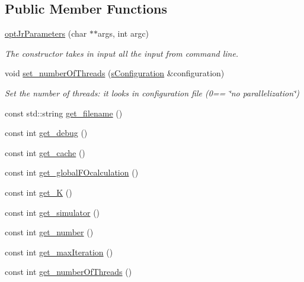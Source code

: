 \subsection*{Public Member Functions}
\begin{DoxyCompactItemize}
\item 
\hyperlink{classoptJrParameters_a76f806d48141b4b4c7a215c2645011de}{opt\-Jr\-Parameters} (char $\ast$$\ast$args, int argc)
\begin{DoxyCompactList}\small\item\em The constructor takes in input all the input from command line. \end{DoxyCompactList}\item 
void \hyperlink{classoptJrParameters_a3747d78e5dd35b8b1aa1c037e9d91cf7}{set\-\_\-number\-Of\-Threads} (\hyperlink{readConfigurationFile_8hh_ab8f35b1da3261263c5e9c0e7c8921f5c}{s\-Configuration} \&configuration)
\begin{DoxyCompactList}\small\item\em Set the number of threads\-: it looks in configuration file (0== \char`\"{}no parallelization\char`\"{}) \end{DoxyCompactList}\item 
const std\-::string \hyperlink{classoptJrParameters_a8dcc738e721b3df88c2622712ed83414}{get\-\_\-filename} ()
\item 
const int \hyperlink{classoptJrParameters_a64016f274261a7a7d74d8460bb7e2ee4}{get\-\_\-debug} ()
\item 
const int \hyperlink{classoptJrParameters_ac698812fa1177c71eb46dc61d2e5af77}{get\-\_\-cache} ()
\item 
const int \hyperlink{classoptJrParameters_a7eec5151603fd03276b6fcf6213f9f90}{get\-\_\-global\-F\-Ocalculation} ()
\item 
const int \hyperlink{classoptJrParameters_a8274b4a95698ce1681147fdddbced0d8}{get\-\_\-\-K} ()
\item 
const int \hyperlink{classoptJrParameters_a199e3fc83f3efb82fc63796a540d6589}{get\-\_\-simulator} ()
\item 
const int \hyperlink{classoptJrParameters_a9bb0e783bd6bf555e86cea874f13cb4f}{get\-\_\-number} ()
\item 
const int \hyperlink{classoptJrParameters_a73340961e894748c6c143284e0b278fa}{get\-\_\-max\-Iteration} ()
\item 
const int \hyperlink{classoptJrParameters_a6654c5bb36a825393e759b2824444bbb}{get\-\_\-number\-Of\-Threads} ()
\end{DoxyCompactItemize}
